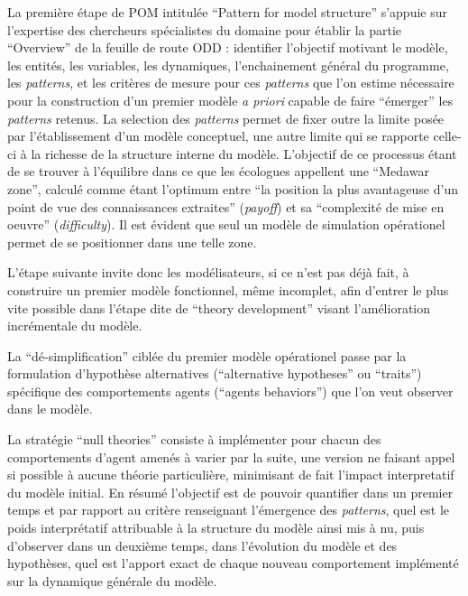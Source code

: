 La première étape de POM intitulée \foreignquote{english}{Pattern for model structure} s'appuie sur l'expertise des chercheurs spécialistes du domaine pour établir la partie \foreignquote{english}{Overview} de la feuille de route ODD : identifier l'objectif motivant le modèle, les entités, les variables, les dynamiques, l'enchainement général du programme, les \textit{patterns}, et les critères de mesure pour ces \textit{patterns} que l'on estime nécessaire pour la construction d'un premier modèle \textit{a priori} capable de faire \enquote{émerger} les \textit{patterns} retenus. La selection des \textit{patterns} permet de fixer outre la limite posée par l'établissement d'un modèle conceptuel, une autre limite qui se rapporte celle-ci à la richesse de la structure interne du modèle. L'objectif de ce processus étant de se trouver à l'équilibre dans ce que les écologues appellent une \foreignquote{english}{Medawar zone}, calculé comme étant l'optimum entre \enquote{la position la plus avantageuse d'un point de vue des connaissances extraites} (\textit{payoff}) et sa \enquote{complexité de mise en oeuvre} (\textit{difficulty}). Il est évident que seul un modèle de simulation opérationel permet de se positionner dans une telle zone. 

L'étape suivante invite donc les modélisateurs, si ce n'est pas déjà fait, à construire un premier modèle fonctionnel, même incomplet, afin d'entrer le plus vite possible dans l'étape dite de \foreignquote{english}{theory development} visant l'amélioration incrémentale du modèle.

La \enquote{dé-simplification} ciblée du premier modèle opérationel passe par la formulation d'hypothèse alternatives (\foreignquote{english}{alternative hypotheses} ou \foreignquote{english}{traits}) spécifique des comportements agents (\foreignquote{english}{agents behaviors}) que l'on veut observer dans le modèle.  

La stratégie \foreignquote{english}{null theories}   consiste à implémenter pour chacun des comportements d'agent amenés à varier par la suite, une version ne faisant appel si possible à aucune théorie particulière, minimisant de fait l'impact interpretatif du modèle initial. En résumé l'objectif est de pouvoir quantifier dans un premier temps et par rapport au critère renseignant l'émergence des \textit{patterns}, quel est le poids interprétatif attribuable à la structure du modèle ainsi mis à nu, puis d'observer dans un deuxième temps, dans l'évolution du modèle et des hypothèses, quel est l'apport exact de chaque nouveau comportement implémenté sur la dynamique générale du modèle.

